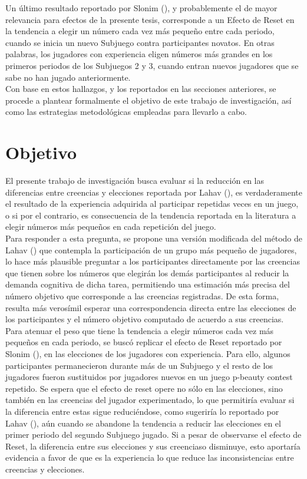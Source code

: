 Un último resultado reportado por Slonim (\citeyear{Slonim}), y probablemente el de mayor relevancia para efectos de la presente tesis, corresponde a un Efecto de Reset en la tendencia a elegir un número cada vez más pequeño entre cada periodo, cuando se inicia un nuevo Subjuego contra participantes novatos. En otras palabras, los jugadores con experiencia eligen números más grandes en los primeros periodos de los Subjuegos 2 y 3, cuando entran nuevos jugadores que se sabe no han jugado anteriormente.\\

Con base en estos hallazgos, y los reportados en las secciones anteriores, se procede a plantear formalmente el objetivo de este trabajo de investigación, así como las estrategias metodológicas empleadas para llevarlo a cabo. 

\section{Objetivo}

El presente trabajo de investigación busca evaluar si la reducción en las diferencias entre creencias y elecciones reportada por Lahav (\citeyear{Lahav}), es verdaderamente el resultado de la experiencia adquirida al participar repetidas veces en un juego, o si por el contrario, es consecuencia de la tendencia reportada en la literatura a elegir números más pequeños en cada repetición del juego.\\

Para responder a esta pregunta, se propone una versión modificada del método de Lahav (\citeyear{Lahav}) que contempla la participación de un grupo más pequeño de jugadores, lo hace más plausible preguntar a los participantes directamente por las creencias que tienen sobre los números que elegirán los demás participantes al reducir la demanda cognitiva de dicha tarea, permitiendo una estimación más precisa del número objetivo que corresponde a las creencias registradas. De esta forma, resulta más verosímil esperar una correspondencia directa entre las elecciones de los participantes y el número objetivo computado de acuerdo a sus creencias.\\

Para atenuar el peso que tiene la tendencia a elegir números cada vez más pequeños en cada periodo, se buscó replicar el efecto de Reset reportado por Slonim (\citeyear{Slonim}), en las elecciones de los jugadores con experiencia. Para ello, algunos participantes permanecieron durante más de un Subjuego y el resto de los jugadores fueron sustituidos por jugadores nuevos en un juego p-beauty contest repetido. Se espera que el efecto de reset opere no sólo en las elecciones, sino también en las creencias del jugador experimentado, lo que permitiría evaluar si la diferencia entre estas sigue reduciéndose, como sugeriría lo reportado por Lahav (\citeyear{Lahav}), aún cuando se abandone la tendencia a reducir las elecciones en el primer periodo del segundo Subjuego jugado. Si a pesar de observarse el efecto de Reset, la diferencia entre sus elecciones y sus creenciaso disminuye, esto aportaría evidencia a favor de que es la experiencia lo que reduce las inconsistencias entre creencias y elecciones.\\

